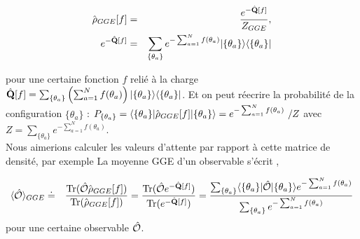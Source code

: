 	\begin{eqnarray}
		\hat{\mathbf{\rho}}_{GGE}[f] & = & \frac{e^{-\hat{\mathbf{Q}}[f]}}{Z_{GGE}}, \\
		e^{-\hat{\mathbf{Q}}[f]} & = & 	\sum_{\{\theta_a \}} e^{- \sum_{a = 1}^N f(\theta_a) } \vert \{ \theta_a\} \rangle \langle  \{ \theta_a\}  \vert 
	\end{eqnarray}
 
	
	pour une certaine fonction $f$ relié à la charge $\hat{\mathbf{Q}} [f]  = \sum_{\{\theta_a \}} \left ( \sum_{a = 1}^N f ( \theta_a )  \right ) \vert \{ \theta_a \} \rangle \langle \{ \theta_a \} \vert $.
	Et on peut réecrire la probabilité de la configuration $\{\theta_a\}$ : $ P_{\{ \theta_a \}} = \langle \{ \theta_a \}\vert \operator{\rho}_{GGE}[f] \vert  \{ \theta_a \} \rangle = e^{-\sum_{a = 1}^N f(\theta_a)} / Z $ avec $Z = \sum_{\{\theta_a \}} e^{-\sum_{a = 1}^N f(\theta_a)}$.\\
	
	 Nous aimerions calculer les valeurs d'attente par rapport à cette matrice de densité, par exemple
	La moyenne GGE d'un observable s'écrit ,
	\begin{aff}
	\begin{eqnarray}
		\langle \hat{\mathbf{\mathcal{O}}} \rangle_{GGE} & \doteq & \displaystyle  \frac{\text{Tr} (\hat{\mathbf{\mathcal{O}}}\hat{\mathbf{\rho}}_{GGE}[f])}{\text{Tr} (\hat{\mathbf{\rho}}_{GGE}[f])} = \frac{\text{Tr} (\hat{\mathbf{\mathcal{O}}}e^{-\hat{\mathbf{Q}}[f]})}{\text{Tr} (e^{-\hat{\mathbf{Q}}[f]})}	 = \frac{\sum_{\{\theta_a \}} \langle  \{ \theta_a\}  \vert   \hat{\mathbf{\mathcal{O}}} \vert \{ \theta_a\} \rangle e^{- \sum_{a = 1}^N f(\theta_a) }  }{\sum_{\{\theta_a  \}} e^{- \sum_{a = 1}^N  f(\theta_a) } }
	\end{eqnarray}
	pour une certaine observable $\hat{\mathbf{\mathcal{O}}}$.\\
	\end{aff}
